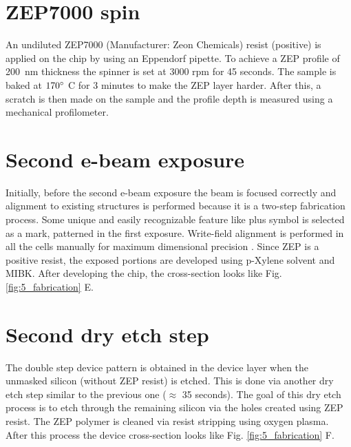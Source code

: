 \documentclass[../report.tex]{subfiles}
\begin{document}
\section{ZEP7000 spin}
An undiluted ZEP7000 (Manufacturer: Zeon Chemicals) resist (positive) is applied on the chip by using an Eppendorf pipette. To achieve a ZEP profile of \SI{200}{\nano \meter} thickness the spinner is set at 3000 rpm for 45 seconds. The sample is baked at $\mathrm{170^{\circ}}$ C for 3 minutes to make the ZEP layer harder. After this, a scratch is then made on the sample and the profile depth is measured using a mechanical profilometer.

\section{Second e-beam exposure}
Initially, before the second e-beam exposure the beam is focused correctly and alignment to existing structures is performed because it is a two-step fabrication process. Some unique and easily recognizable feature like plus symbol is selected as a mark, patterned in the first exposure. Write-field alignment is performed in all the cells manually for maximum dimensional precision \cite{write_field}. Since ZEP is a positive resist, the exposed portions are developed using p-Xylene solvent and MIBK. After developing the chip, the cross-section looks like Fig. \ref{fig:5_fabrication} E.

\section{Second dry etch step}
The double step device pattern is obtained in the device layer when the unmasked silicon (without ZEP resist) is etched. This is done via another dry etch step similar to the previous one ($\approx$ 35 seconds). The goal of this dry etch process is to etch through the remaining silicon via the holes created using ZEP resist. The ZEP polymer is cleaned via resist stripping using oxygen plasma. After this process the device cross-section looks like Fig. \ref{fig:5_fabrication} F. 
\end{document}
